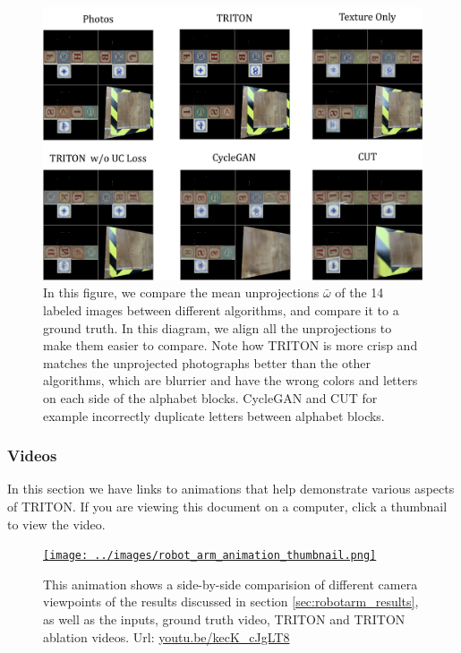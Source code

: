 		\begin{figure}[H]
			\begin{center}
				\includegraphics[width=400pt]{../images/unprojection_comparisons.pdf}
			\end{center}
			\caption{
				In this figure, we compare the mean unprojections $\bar{\omega}$ of the 14 labeled images between different algorithms, and compare it to a ground truth. In this diagram, we align all the unprojections to make them easier to compare. Note how TRITON is more crisp and matches the unprojected photographs better than the other algorithms, which are blurrier and have the wrong colors and letters on each side of the alphabet blocks. CycleGAN and CUT for example incorrectly duplicate letters between alphabet blocks.
			}
			\label{fig:unprojection_resolution_comparison}
		\end{figure}

\pagebreak
	\subsubsection{Videos}

		In this section we have links to animations that help demonstrate various aspects of TRITON.
		If you are viewing this document on a computer, click a thumbnail to view the video.

	

		\begin{figure}[H]
			\begin{center}
			\href{https://youtu.be/kecK_cJgLT8}{
					\texttt{[image: ../images/robot\_arm\_animation\_thumbnail.png]}
					}
				\end{center}
			\caption{
				This animation shows a side-by-side comparision of different camera viewpoints of the results discussed in section \ref{sec:robotarm_results}, as well as the inputs, ground truth video, TRITON and TRITON ablation videos.
				Url: \href{https://youtu.be/kecK_cJgLT8}{youtu.be/kecK\_cJgLT8}
			}
			\label{fig:robotarm_anim}
		\end{figure}


